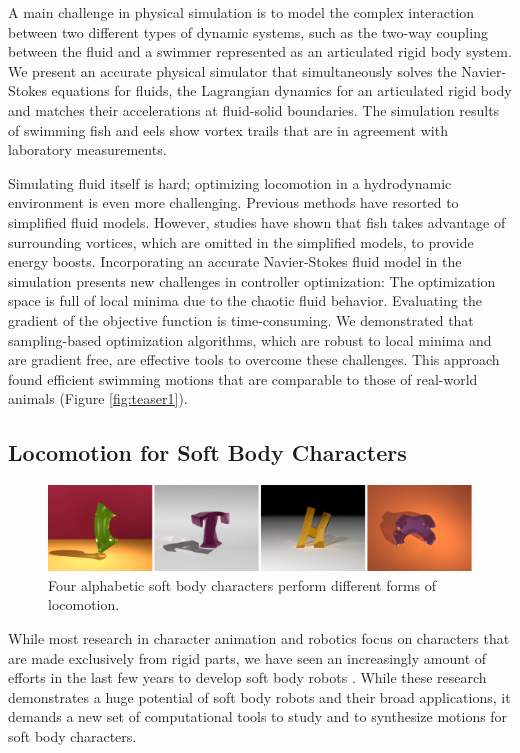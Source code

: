 A main challenge in physical simulation is to model the complex interaction between two different types of dynamic systems, such as the two-way coupling between the fluid and a swimmer represented as an articulated rigid body system. We present an accurate physical simulator \cite{} that simultaneously solves the Navier-Stokes equations for fluids, the Lagrangian dynamics for an articulated rigid body and matches their accelerations at fluid-solid boundaries. The simulation results of swimming fish and eels show vortex trails that are in agreement with laboratory measurements.

Simulating fluid itself is hard; optimizing locomotion in a hydrodynamic environment is even more challenging. Previous methods have resorted to simplified fluid models. However, studies have shown that fish takes advantage of surrounding vortices, which are omitted in the simplified models, to provide energy boosts. Incorporating an accurate Navier-Stokes fluid model in the simulation presents new challenges in controller optimization: The optimization space is full of local minima due to the chaotic fluid behavior. Evaluating the gradient of the objective function is time-consuming. We demonstrated that sampling-based optimization algorithms, which are robust to local minima and are gradient free, are effective tools to overcome these challenges. This approach found efficient swimming motions that are comparable to those of real-world animals (Figure \ref{fig:teaser1}). 

\subsection{Locomotion for Soft Body Characters}

\begin{figure}[!h]
  \centering
    \includegraphics[width=\textwidth]{figures/teaserSoftBody.eps}
  \caption{Four alphabetic soft body characters perform different forms of locomotion.}
  \label{fig:teaser2}
\end{figure}

While most research in character animation and robotics focus on characters that are made exclusively from rigid parts, we have seen an increasingly amount of efforts in the last few years to develop soft body robots \cite{}. While these research demonstrates a huge potential of soft body robots and their broad applications, it demands a new set of computational tools to study and to synthesize motions for soft body characters.

